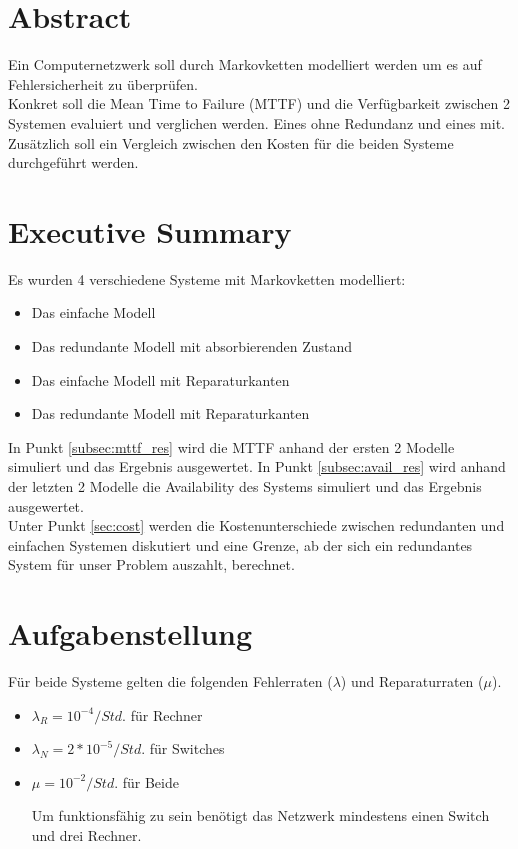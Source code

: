 \documentclass[10pt,a4paper]{article}
\begin{document}


\newpage
\section{Abstract}
Ein Computernetzwerk soll durch Markovketten modelliert werden um es auf Fehlersicherheit zu überprüfen.
\\ 
Konkret soll die Mean Time to Failure (MTTF) und die Verfügbarkeit zwischen 2 Systemen evaluiert und verglichen werden. Eines ohne Redundanz und eines mit.
Zusätzlich soll ein Vergleich zwischen den Kosten für die beiden Systeme durchgeführt werden.

\section{Executive Summary}
Es wurden 4 verschiedene Systeme mit Markovketten modelliert:
\begin{itemize}
	\item Das einfache Modell
	\item Das redundante Modell mit absorbierenden Zustand
	\item Das einfache Modell mit Reparaturkanten
	\item Das redundante Modell mit Reparaturkanten
\end{itemize}
In Punkt \ref{subsec:mttf_res} wird die MTTF anhand der ersten 2 Modelle simuliert und das Ergebnis ausgewertet. In Punkt \ref{subsec:avail_res} wird anhand der letzten 2 Modelle die Availability des Systems simuliert und das Ergebnis ausgewertet. \\
Unter Punkt \ref{sec:cost} werden die Kostenunterschiede zwischen redundanten und einfachen Systemen diskutiert und eine Grenze, ab der sich ein redundantes System für unser Problem auszahlt, berechnet.
\newpage
\section{Aufgabenstellung}
Für beide Systeme gelten die folgenden Fehlerraten ($\lambda$) und Reparaturraten ($\mu$).
\begin{itemize}
	\item $\lambda_R=10^{-4}/Std.$ für Rechner
	\item $\lambda_N=2*10^{-5}/Std.$ für Switches
	\item  $\mu=10^{-2}/Std. $ für Beide
	
Um funktionsfähig zu sein benötigt das Netzwerk mindestens einen Switch und drei Rechner.
\end{itemize}
\end{document}
